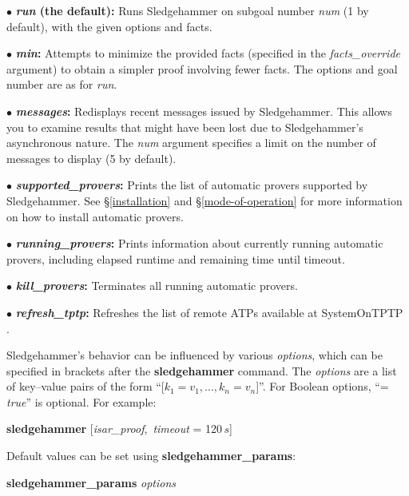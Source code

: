 \documentclass[a4paper,12pt]{article}
\begin{document}
\begin{enum}
\item[$\bullet$] \textbf{\textit{run} (the default):} Runs Sledgehammer on
subgoal number \textit{num} (1 by default), with the given options and facts.

\item[$\bullet$] \textbf{\textit{min}:} Attempts to minimize the provided facts
(specified in the \textit{facts\_override} argument) to obtain a simpler proof
involving fewer facts. The options and goal number are as for \textit{run}.

\item[$\bullet$] \textbf{\textit{messages}:} Redisplays recent messages issued
by Sledgehammer. This allows you to examine results that might have been lost
due to Sledgehammer's asynchronous nature. The \textit{num} argument specifies a
limit on the number of messages to display (5 by default).

\item[$\bullet$] \textbf{\textit{supported\_provers}:} Prints the list of
automatic provers supported by Sledgehammer. See \S\ref{installation} and
\S\ref{mode-of-operation} for more information on how to install automatic
provers.

\item[$\bullet$] \textbf{\textit{running\_provers}:} Prints information about
currently running automatic provers, including elapsed runtime and remaining
time until timeout.

\item[$\bullet$] \textbf{\textit{kill\_provers}:} Terminates all running
automatic provers.

\item[$\bullet$] \textbf{\textit{refresh\_tptp}:} Refreshes the list of remote
ATPs available at System\-On\-TPTP \cite{sutcliffe-2000}.
\end{enum}

Sledgehammer's behavior can be influenced by various \textit{options}, which can
be specified in brackets after the \textbf{sledgehammer} command. The
\textit{options} are a list of key--value pairs of the form ``[$k_1 = v_1,
\ldots, k_n = v_n$]''. For Boolean options, ``= \textit{true}'' is optional. For
example:

\prew
\textbf{sledgehammer} [\textit{isar\_proof}, \,\textit{timeout} = 120$\,s$]
\postw

Default values can be set using \textbf{sledgehammer\_\allowbreak params}:

\prew
\textbf{sledgehammer\_params} \textit{options}
\postw
\end{document}
